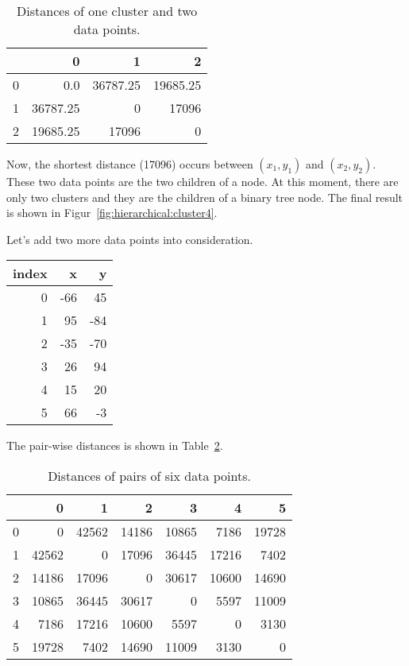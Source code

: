 \begin{table}
  \begin{tt}
\begin{tabular}{|r|rrr|}  \hline
& 0 & 1 & 2   \\ \hline

0 & 0.0 & 36787.25 & 19685.25 \\
1 & 36787.25 & 0 & 17096 \\
2 & 19685.25 & 17096 & 0 \\ \hline
\end{tabular}
  \end{tt}
  \caption{Distances of one cluster and two  data points.}
  \label{table:hierarchical:distance3}
\end{table}

Now, the shortest distance (17096) occurs between $(x_1, y_1)$ and
$(x_2, y_2)$.  These two data points are the two children of a node.
At this moment, there are only two clusters and they are the children
of a binary tree node.  The final result is shown in
Figur~\ref{fig:hierarchical:cluster4}.

Let's add two more data points into consideration.

\begin{table}[h]
\begin{tt}
\begin{tabular}{|r|rr|} \hline
{\bf index} &  {\bf x} & {\bf y} \\ \hline
0 & -66 &  45 \\
1 & 95  &  -84 \\
2 & -35  &  -70 \\
3 & 26  &  94 \\
4 & 15 & 20 \\
5 & 66 & -3 \\ \hline
\end{tabular}
\end{tt}
\end{table}

The pair-wise distances is shown in Table~\ref{table:hierarchical:distance6points}.

\begin{table}
  \begin{tt}
\begin{tabular}{|r|rrrrrr|}  \hline
& 0 & 1 & 2 & 3 & 4 & 5 \\ \hline

0 & 0& 42562& 14186& 10865 & 7186 & 19728\\
1 & 42562& 0& 17096& 36445 & 17216 & 7402\\
2 & 14186& 17096& 0& 30617 & 10600 & 14690\\
  3 & 10865& 36445& 30617& 0 & 5597 & 11009 \\
  4 & 7186 & 17216 & 10600 & 5597 & 0 & 3130 \\ 
  5 & 19728 & 7402 & 14690 & 11009 & 3130 & 0   \\ \hline
\end{tabular}
  \end{tt}
  \caption{Distances of pairs of six data points.}
  \label{table:hierarchical:distance6points}
\end{table}

